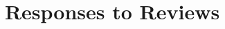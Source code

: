 \documentclass[10pt,journal]{IEEEtran}
\begin{document}
%
\title{Responses to Reviews}
%
%
%
%
\end{document}
